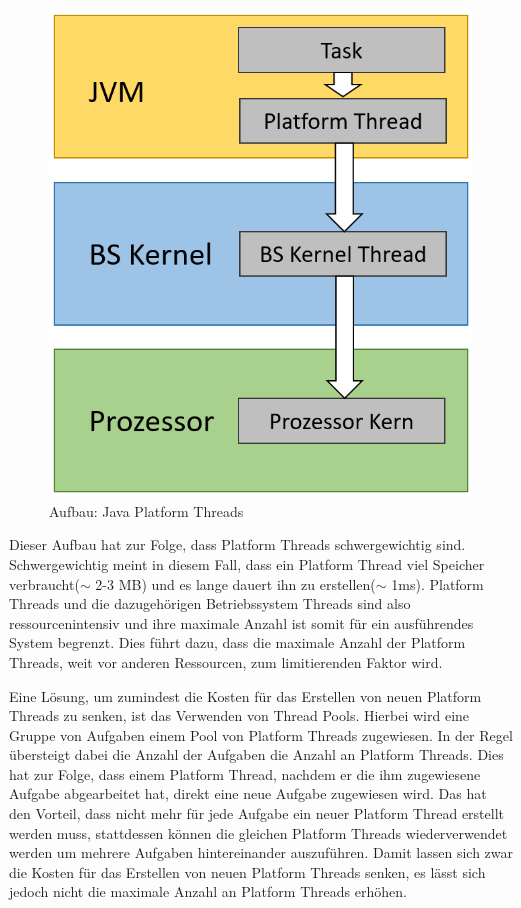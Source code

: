 \documentclass[fontsize=12pt,paper=a4,twoside=semi,parskip=half-,headsepline,headinclude]{scrreprt}
\begin{document}
\begin{figure}[h]
	\centering
	\includegraphics[scale=0.5]{figures/PlatformThreads.png}
	\caption{Aufbau: Java Platform Threads}
	\label{fig:PlatformThreads}
\end{figure}

Dieser Aufbau hat zur Folge, dass Platform Threads schwergewichtig sind. Schwergewichtig meint in diesem Fall, dass ein Platform Thread viel Speicher verbraucht($\sim$ 2-3 MB) und es lange dauert ihn zu erstellen($\sim$ 1ms). Platform Threads und die dazugehörigen Betriebssystem Threads sind also ressourcenintensiv und ihre maximale Anzahl ist somit für ein ausführendes System begrenzt. Dies führt dazu, dass die maximale Anzahl der Platform Threads, weit vor anderen Ressourcen, zum limitierenden Faktor wird. 

Eine Lösung, um zumindest die Kosten für das Erstellen von neuen Platform Threads zu senken, ist das Verwenden von Thread Pools. Hierbei wird eine Gruppe von Aufgaben einem Pool von Platform Threads zugewiesen. In der Regel übersteigt dabei die Anzahl der Aufgaben die Anzahl an Platform Threads. Dies hat zur Folge, dass einem Platform Thread, nachdem er die ihm zugewiesene Aufgabe abgearbeitet hat, direkt eine neue Aufgabe zugewiesen wird. Das hat den Vorteil, dass nicht mehr für jede Aufgabe ein neuer Platform Thread erstellt werden muss, stattdessen können die gleichen Platform Threads wiederverwendet werden um mehrere Aufgaben hintereinander auszuführen. Damit lassen sich zwar die Kosten für das Erstellen von neuen Platform Threads senken, es lässt sich jedoch nicht die maximale Anzahl an Platform Threads erhöhen.
\end{document}
